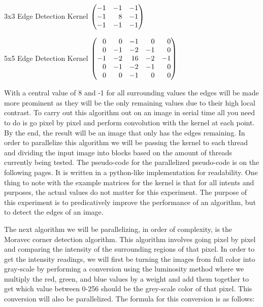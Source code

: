 \documentclass{article}
\begin{document}
        3x3 Edge Detection Kernel
        $\begin{pmatrix*}[r]
        -1 & -1 & -1\\
        -1 &  8 & -1\\
        -1 & -1 & -1
        \end{pmatrix*}\\\\$
        
        5x5 Edge Detection Kernel
        $\begin{pmatrix*}[r]
        0 &   0 & -1 &  0 &  0\\
        0 &  -1 & -2 & -1 &  0\\
        -1 & -2 & 16 & -2 & -1\\
        0 &  -1 & -2 & -1 &  0\\
        0 &   0 & -1 &  0 &  0
        \end{pmatrix*}\\\\$
        
        With a central value of 8 and -1 for all surrounding values the edges will be made more prominent as they will be the only remaining values due to their high local contrast.  To carry out this algorithm out on an image in serial time all you need to do is go pixel by pixel and perform convolution with the kernel at each point.  By the end, the result will be an image that only has the edges remaining.  In order to parallelize this algorithm we will be passing the kernel to each thread and dividing the input image into blocks based on the amount of threads currently being tested.  The pseudo-code for the parallelized pseudo-code is on the following pages.  It is written in a python-like implementation for readability.  One thing to note with the example matrices for the kernel is that for all intents and purposes, the actual values do not matter for this experiment.  The purpose of this experiment is to predicatively improve the performance of an algorithm, but to detect the edges of an image.
        
        The next algorithm we will be parallelizing, in order of complexity, is the Moravec corner detection algorithm.  This algorithm involves going pixel by pixel and comparing the intensity of the surrounding regions of that pixel.  In order to get the intensity readings, we will first be turning the images from full color into gray-scale by performing a conversion using the luminosity method where we multiply the red, green, and blue values by a weight and add them together to get which value between 0-256 should be the grey-scale color of that pixel.  This conversion will also be parallelized.  The formula for this conversion is as follows:\\\\
        
\end{document}
